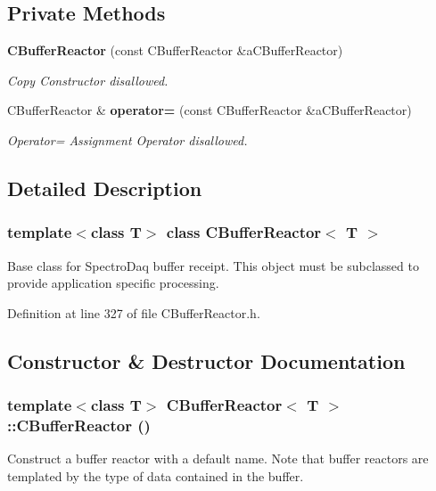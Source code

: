 \subsection*{Private Methods}
\begin{CompactItemize}
\item 
{\bf CBuffer\-Reactor} (const CBuffer\-Reactor \&a\-CBuffer\-Reactor)
\begin{CompactList}\small\item\em Copy Constructor disallowed.\item\end{CompactList}\item 
CBuffer\-Reactor \& {\bf operator=} (const CBuffer\-Reactor \&a\-CBuffer\-Reactor)
\begin{CompactList}\small\item\em Operator= Assignment Operator disallowed.\item\end{CompactList}\end{CompactItemize}


\subsection{Detailed Description}
\subsubsection*{template$<$class T$>$ class CBuffer\-Reactor$<$ T $>$}

Base class for Spectro\-Daq buffer receipt. This object must be subclassed to provide application specific processing. 



Definition at line 327 of file CBuffer\-Reactor.h.

\subsection{Constructor \& Destructor Documentation}
\subsubsection{\setlength{\rightskip}{0pt plus 5cm}template$<$class T$>$ CBuffer\-Reactor$<$ T $>$::CBuffer\-Reactor ()}\label{classCBufferReactor_a0}


Construct a buffer reactor with a default name. Note that buffer reactors are templated by the type of data contained in the buffer. 

